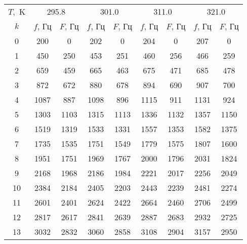 \begin{tabular}{ccccccccc}
\toprule
$T,$ K & \multicolumn{2}{c}{295.8} & \multicolumn{2}{c}{301.0} & \multicolumn{2}{c}{311.0} & \multicolumn{2}{c}{321.0} \\
$k$ & $f$, Гц & $F$, Гц & $f$, Гц & $F$, Гц & $f$, Гц & $F$, Гц & $f$, Гц & $F$, Гц \\
\midrule
0 & 200 & 0 & 202 & 0 & 204 & 0 & 207 & 0 \\
1 & 450 & 250 & 453 & 251 & 460 & 256 & 466 & 259 \\
2 & 659 & 459 & 665 & 463 & 675 & 471 & 685 & 478 \\
3 & 872 & 672 & 880 & 678 & 894 & 690 & 907 & 700 \\
4 & 1087 & 887 & 1098 & 896 & 1115 & 911 & 1131 & 924 \\
5 & 1303 & 1103 & 1315 & 1113 & 1336 & 1132 & 1357 & 1150 \\
6 & 1519 & 1319 & 1533 & 1331 & 1557 & 1353 & 1582 & 1375 \\
7 & 1735 & 1535 & 1751 & 1549 & 1779 & 1575 & 1807 & 1600 \\
8 & 1951 & 1751 & 1969 & 1767 & 2000 & 1796 & 2031 & 1824 \\
9 & 2168 & 1968 & 2186 & 1984 & 2221 & 2017 & 2256 & 2049 \\
10 & 2384 & 2184 & 2405 & 2203 & 2443 & 2239 & 2481 & 2274 \\
11 & 2601 & 2401 & 2624 & 2422 & 2664 & 2460 & 2706 & 2499 \\
12 & 2817 & 2617 & 2841 & 2639 & 2887 & 2683 & 2932 & 2725 \\
13 & 3032 & 2832 & 3060 & 2858 & 3108 & 2904 & 3157 & 2950 \\
\bottomrule
\end{tabular}
